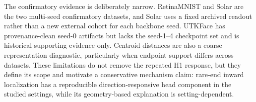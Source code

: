 The confirmatory evidence is deliberately narrow. RetinaMNIST and Solar are
the two multi-seed confirmatory datasets, and Solar uses a fixed archived
readout rather than a new external cohort for each backbone seed. UTKFace has
provenance-clean seed-0 artifacts but lacks the seed-1--4 checkpoint set and is
historical supporting evidence only. Centroid distances are also a coarse
representation diagnostic, particularly when endpoint support differs across
datasets. These limitations do not remove the repeated H1 response, but they
define its scope and motivate a conservative mechanism claim: rare-end inward
localization has a reproducible direction-responsive head component in the
studied settings, while its geometry-based explanation is setting-dependent.
